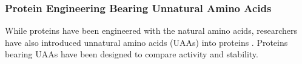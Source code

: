 \begin{refsection}
\subsubsection{Protein Engineering Bearing Unnatural Amino Acids}
\label{sec:uaa-intro}

While proteins have been engineered with the natural amino acids, researchers
have also introduced unnatural amino acids (UAAs) into proteins
\cite{Odar2015,Hassan2008,Kiick2000,Hammill2007,Meinnel1990,Johnson2010}.
Proteins bearing UAAs have been designed to compare activity and stability.  


\end{refsection}
